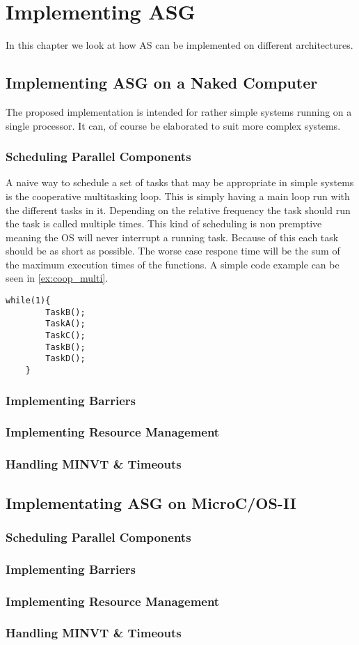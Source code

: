 \documentclass[../main.tex]{subfiles}
\begin{document}
\chapter{Implementing ASG}
In this chapter we look at how AS can be implemented on different architectures.

\section{Implementing ASG on a Naked Computer}
The proposed implementation is intended for rather simple systems running on a single processor. It can, of course be elaborated to suit more complex systems.
\subsection{Scheduling Parallel Components}
A naive way to schedule a set of tasks that may be appropriate in simple systems is the cooperative multitasking loop.
This is simply having a main loop run with the different tasks in it.
Depending on the relative frequency the task should run the task is called multiple times.
This kind of scheduling is non premptive meaning the OS will never interrupt a running task.
Because of this each task should be as short as possible.
The worse case respone time will be the sum of the maximum execution times of the functions.
A simple code example can be seen in \ref{ex:coop_multi}.

\begin{lstlisting}[style=cstyle, caption=Example of cooperative multitasking where task A is run twice as frequent as task B. ,label=ex:coop_multi]
	while(1){
		TaskB();
		TaskA();
		TaskC();
		TaskB();
		TaskD();
	}
\end{lstlisting}

\subsection{Implementing Barriers}
\subsection{Implementing Resource Management}
\subsection{Handling MINVT \& Timeouts}

\section{Implementating ASG on MicroC/OS-II}

\subsection{Scheduling Parallel Components}
\subsection{Implementing Barriers}
\subsection{Implementing Resource Management}
\subsection{Handling MINVT \& Timeouts}
\end{document}
